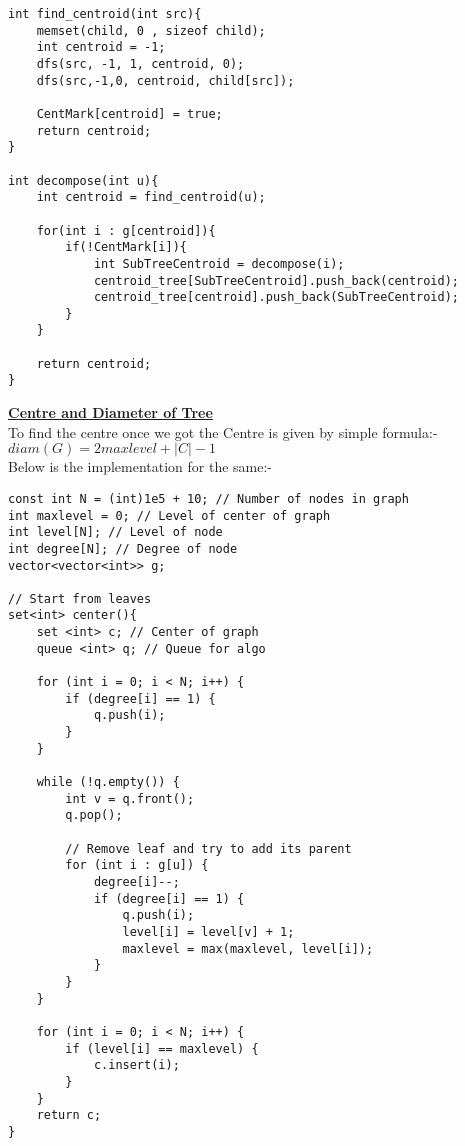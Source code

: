 \documentclass[10pt,a4paper]{report}
\begin{document}
\begin{landscape}
\begin{multicols}{2}
\begin{verbatim}
int find_centroid(int src){
	memset(child, 0 , sizeof child);
	int centroid = -1;
	dfs(src, -1, 1, centroid, 0); 
	dfs(src,-1,0, centroid, child[src]);

	CentMark[centroid] = true; 
	return centroid; 
}

int decompose(int u){
	int centroid = find_centroid(u); 

	for(int i : g[centroid]){
		if(!CentMark[i]){
			int SubTreeCentroid = decompose(i); 
			centroid_tree[SubTreeCentroid].push_back(centroid); 
			centroid_tree[centroid].push_back(SubTreeCentroid);
		}
	}

	return centroid; 
}
\end{verbatim}


\begin{flushleft}
\underline{\textbf{Centre and Diameter of Tree}}\\
To find the centre once we got the Centre is given by simple formula:-\\
\textbf{$diam(G) = 2maxlevel + |C| - 1$}\\
Below is the implementation for the same:-
\end{flushleft}

\begin{verbatim}
const int N = (int)1e5 + 10; // Number of nodes in graph
int maxlevel = 0; // Level of center of graph
int level[N]; // Level of node
int degree[N]; // Degree of node
vector<vector<int>> g;

// Start from leaves
set<int> center(){
    set <int> c; // Center of graph
    queue <int> q; // Queue for algo
    
    for (int i = 0; i < N; i++) {
        if (degree[i] == 1) {
            q.push(i);
        }
    }

    while (!q.empty()) {
        int v = q.front();
        q.pop();

        // Remove leaf and try to add its parent
        for (int i : g[u]) {
            degree[i]--;
            if (degree[i] == 1) {
                q.push(i);
                level[i] = level[v] + 1;
                maxlevel = max(maxlevel, level[i]);
            }
        }
    }

    for (int i = 0; i < N; i++) {
        if (level[i] == maxlevel) {
            c.insert(i);
        }
    }
    return c; 
}
\end{verbatim}




\end{multicols}
\end{landscape}
\end{document}
